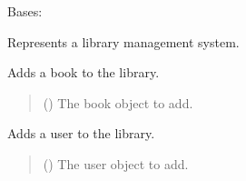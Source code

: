 \documentclass[letterpaper,10pt,english,openany,oneside]{sphinxmanual}
\begin{document}
\begin{fulllineitems}
\label{\detokenize{library:library.Library}}
\pysigstartsignatures
{}
\pysigstopsignatures
\sphinxAtStartPar
Bases: 

\sphinxAtStartPar
Represents a library management system.

\begin{fulllineitems}
\label{\detokenize{library:library.Library.add_book}}
\pysigstartsignatures
{}
\pysigstopsignatures
\sphinxAtStartPar
Adds a book to the library.
\begin{quote}\begin{description}
\sphinxAtStartPar
{} ({\hyperref[\detokenize{book:book.Book}]{}}) \textendash{} The book object to add.

\end{description}\end{quote}

\end{fulllineitems}


\begin{fulllineitems}
\label{\detokenize{library:library.Library.add_user}}
\pysigstartsignatures
{}
\pysigstopsignatures
\sphinxAtStartPar
Adds a user to the library.
\begin{quote}\begin{description}
\sphinxAtStartPar
{} ({\hyperref[\detokenize{user:user.User}]{}}) \textendash{} The user object to add.

\end{description}\end{quote}

\end{fulllineitems}


\end{fulllineitems}
\end{document}
